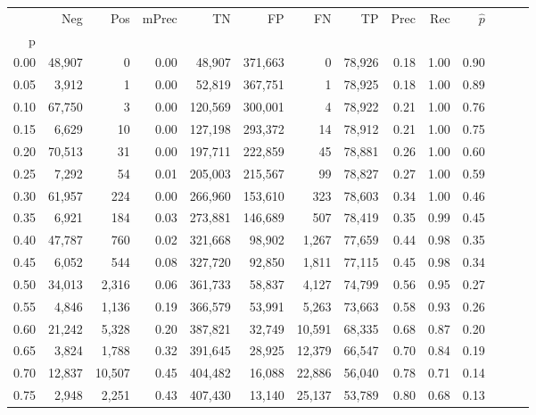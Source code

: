 \begin{tabular}{rrrrrrrrrrrrrr}
\toprule
{} &     Neg &     Pos & mPrec &       TN &       FP &      FN &      TP &  Prec &   Rec & $\hat{p}$ \\
p    &         &         &       &          &          &         &         &       &       &           \\
\midrule
0.00 &  48,907 &       0 &  0.00 &   48,907 &  371,663 &       0 &  78,926 &  0.18 &  1.00 &      0.90 \\
0.05 &   3,912 &       1 &  0.00 &   52,819 &  367,751 &       1 &  78,925 &  0.18 &  1.00 &      0.89 \\
0.10 &  67,750 &       3 &  0.00 &  120,569 &  300,001 &       4 &  78,922 &  0.21 &  1.00 &      0.76 \\
0.15 &   6,629 &      10 &  0.00 &  127,198 &  293,372 &      14 &  78,912 &  0.21 &  1.00 &      0.75 \\
0.20 &  70,513 &      31 &  0.00 &  197,711 &  222,859 &      45 &  78,881 &  0.26 &  1.00 &      0.60 \\
0.25 &   7,292 &      54 &  0.01 &  205,003 &  215,567 &      99 &  78,827 &  0.27 &  1.00 &      0.59 \\
0.30 &  61,957 &     224 &  0.00 &  266,960 &  153,610 &     323 &  78,603 &  0.34 &  1.00 &      0.46 \\
0.35 &   6,921 &     184 &  0.03 &  273,881 &  146,689 &     507 &  78,419 &  0.35 &  0.99 &      0.45 \\
0.40 &  47,787 &     760 &  0.02 &  321,668 &   98,902 &   1,267 &  77,659 &  0.44 &  0.98 &      0.35 \\
0.45 &   6,052 &     544 &  0.08 &  327,720 &   92,850 &   1,811 &  77,115 &  0.45 &  0.98 &      0.34 \\
0.50 &  34,013 &   2,316 &  0.06 &  361,733 &   58,837 &   4,127 &  74,799 &  0.56 &  0.95 &      0.27 \\
0.55 &   4,846 &   1,136 &  0.19 &  366,579 &   53,991 &   5,263 &  73,663 &  0.58 &  0.93 &      0.26 \\
0.60 &  21,242 &   5,328 &  0.20 &  387,821 &   32,749 &  10,591 &  68,335 &  0.68 &  0.87 &      0.20 \\
0.65 &   3,824 &   1,788 &  0.32 &  391,645 &   28,925 &  12,379 &  66,547 &  0.70 &  0.84 &      0.19 \\
0.70 &  12,837 &  10,507 &  0.45 &  404,482 &   16,088 &  22,886 &  56,040 &  0.78 &  0.71 &      0.14 \\
0.75 &   2,948 &   2,251 &  0.43 &  407,430 &   13,140 &  25,137 &  53,789 &  0.80 &  0.68 &      0.13 \\

\end{tabular}
